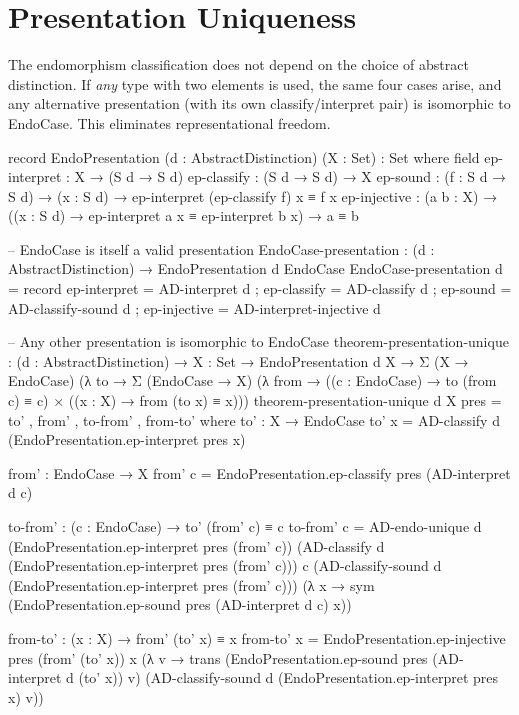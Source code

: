 \documentclass[11pt,a4paper]{book}
\begin{document}
\section{Presentation Uniqueness}
\label{sec:presentation-unique}

The endomorphism classification does not depend on the choice of abstract distinction.
If \emph{any} type with two elements is used, the same four cases arise, and any
alternative presentation (with its own classify/interpret pair) is isomorphic to
EndoCase. This eliminates representational freedom.

\begin{code}
record EndoPresentation (d : AbstractDistinction) (X : Set) : Set where
  field
    ep-interpret : X → (S d → S d)
    ep-classify  : (S d → S d) → X
    ep-sound     : (f : S d → S d) → (x : S d) →
                   ep-interpret (ep-classify f) x ≡ f x
    ep-injective : (a b : X) →
                   ((x : S d) → ep-interpret a x ≡ ep-interpret b x) →
                   a ≡ b

-- EndoCase is itself a valid presentation
EndoCase-presentation : (d : AbstractDistinction) → EndoPresentation d EndoCase
EndoCase-presentation d = record
  { ep-interpret = AD-interpret d
  ; ep-classify  = AD-classify d
  ; ep-sound     = AD-classify-sound d
  ; ep-injective = AD-interpret-injective d
  }

-- Any other presentation is isomorphic to EndoCase
theorem-presentation-unique : (d : AbstractDistinction) →
  {X : Set} → EndoPresentation d X →
  Σ (X → EndoCase) (λ to →
  Σ (EndoCase → X) (λ from →
  ((c : EndoCase) → to (from c) ≡ c) ×
  ((x : X) → from (to x) ≡ x)))
theorem-presentation-unique d {X} pres =
  to' , from' , to-from' , from-to'
  where
    to' : X → EndoCase
    to' x = AD-classify d (EndoPresentation.ep-interpret pres x)

    from' : EndoCase → X
    from' c = EndoPresentation.ep-classify pres (AD-interpret d c)

    to-from' : (c : EndoCase) → to' (from' c) ≡ c
    to-from' c = AD-endo-unique d
      (EndoPresentation.ep-interpret pres (from' c))
      (AD-classify d (EndoPresentation.ep-interpret pres (from' c)))
      c
      (AD-classify-sound d (EndoPresentation.ep-interpret pres (from' c)))
      (λ x → sym (EndoPresentation.ep-sound pres (AD-interpret d c) x))

    from-to' : (x : X) → from' (to' x) ≡ x
    from-to' x = EndoPresentation.ep-injective pres
      (from' (to' x)) x
      (λ v → trans
        (EndoPresentation.ep-sound pres (AD-interpret d (to' x)) v)
        (AD-classify-sound d (EndoPresentation.ep-interpret pres x) v))
\end{code}
\end{document}
